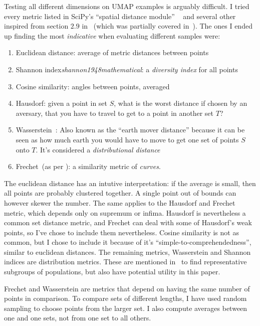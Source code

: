 \documentclass[10pt,twocolumn,letterpaper]{article}
\begin{document}
Testing all different dimensions on \gls{UMAP} examples is arguably difficult. I tried every metric listed in SciPy's ``spatial distance module'' ~\cite{scipy} and several other inspired from section $2.9$ in~\cite{datarepresentativity} (which was partially covered in~). The ones I ended up finding the most \textit{indicative} when evaluating different samples were:
\begin{enumerate}
  \item Euclidean distance: average of metric distances between points
  \item Shannon index\textit{shannon1948mathematical}: a \textit{diversity index} for all points 
  \item Cosine similarity: angles between points, averaged
  \item Hausdorf: given a point in set $S$, what is the worst distance if chosen by an aversary, that you have to travel to get to a point in another set $T$?
  \item Wasserstein~\cite{vaserstein1969markov}: Also known as the ``earth mover distance'' because it can be seen as how much earth you would have to move to get one set of points $S$ onto $T$. It's considered a \textit{distributional distance}
  \item Frechet~(as per \cite{eiter1994computing}): a similarity metric of \textit{curves}.
\end{enumerate}

The euclidean distance has an intutive interpretation: if the average is small, then all points are probably clustered together. A single point out of bounds can however skewer the number. The same applies to the Hausdorf and Frechet metric, which depends only on supremum or infima. Hausdorf is nevertheless a common set distance metric, and Frechet can deal with some of Hausdorf's weak points, so I've chose to include them nevertheless. Cosine similarity is not as common, but I chose to include it because of it's ``simple-to-comprehendedness'', similar to euclidean distances. The remaining metrics, Wasserstein and Shannon indices are distribution metrics. These are mentioned in~\cite{datarepresentativity} to find representative subgroups of populations, but also have potential utility in this paper. 

Frechet and Wasserstein are metrics that depend on having the same number of points in comparison. To compare sets of different lengths, I have used random sampling to choose points from the larger set. I also compute averages between one and one sets, not from one set to all others.
\end{document}
